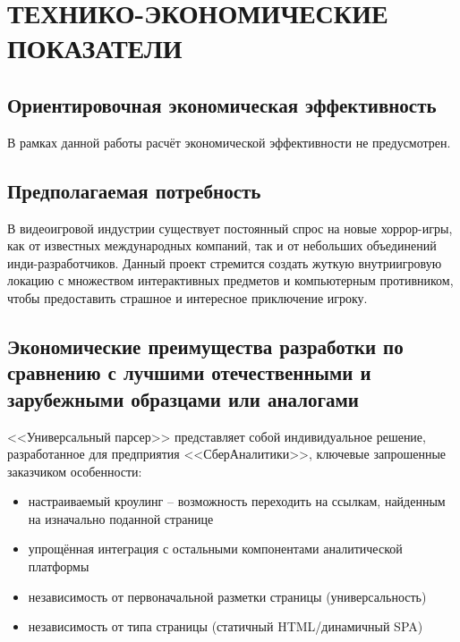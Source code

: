 \section{ТЕХНИКО-ЭКОНОМИЧЕСКИЕ ПОКАЗАТЕЛИ}

\subsection{Ориентировочная экономическая эффективность}

В рамках данной работы расчёт экономической эффективности не предусмотрен.

\subsection{Предполагаемая потребность}

В видеоигровой индустрии существует постоянный спрос на новые хоррор-игры, как от известных международных компаний, так и от небольших объединений инди-разработчиков. Данный проект стремится создать жуткую внутриигровую локацию с множеством интерактивных предметов и компьютерным противником, чтобы предоставить страшное и интересное приключение игроку.
\subsection{Экономические преимущества разработки по сравнению с лучшими отечественными и зарубежными образцами или аналогами}

<<Универсальный парсер>> представляет собой индивидуальное решение, разработанное для предприятия <<СберАналитики>>, ключевые запрошенные заказчиком особенности:

\begin{itemize}
    \item настраиваемый кроулинг -- возможность переходить на ссылкам, найденным на изначально поданной странице
    \item упрощённая интеграция с остальными компонентами аналитической платформы
    \item независимость от первоначальной разметки страницы (универсальность)
    \item независимость от типа страницы (статичный HTML/динамичный SPA)
\end{itemize}